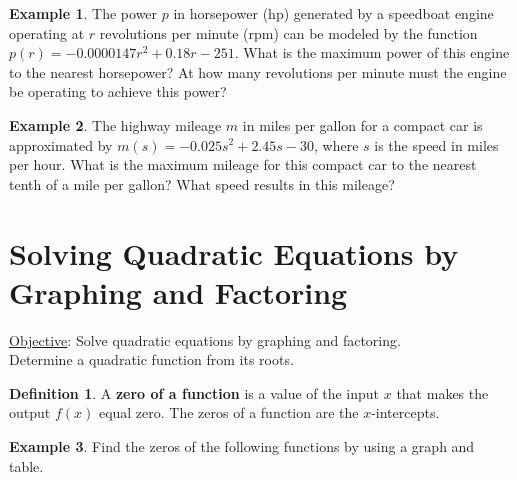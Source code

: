 \documentclass{report}
\theoremstyle{definition}
\newtheorem{example}{\bf Example}
\newtheorem{definition}{\bf Definition}[section]
\begin{document}
 \newpage


\begin{example}
The power $p$ in horsepower (hp) generated by a speedboat engine operating at $r$ revolutions per minute (rpm) can be modeled by
the function $p(r)=-0.0000147r^2+0.18r-251$. What is the maximum power of this engine to the nearest horsepower? At how many 
revolutions per minute must the engine be operating to achieve this power?
\end{example}
\vfill
\begin{example}
The highway mileage $m$ in miles per gallon for a compact car is approximated by $m(s) = -0.025s^2+2.45s-30$, where $s$ is the speed 
in miles per hour. What is the maximum mileage for this compact car to the nearest tenth of a mile per gallon? What speed results in this
 mileage?
\end{example}

\vfill

 \noindent{}

 \newpage


 \section{ Solving Quadratic Equations by Graphing and Factoring  }
 \setcounter{example}{0}
 \setcounter{definition}{0}
 \setcounter{youtry}{0}
 \hfill \small \underline{Objective}: Solve quadratic equations by graphing and factoring.\\ \hfill \indent \hfill Determine a quadratic function from its roots. \normalsize \\
 \begin{definition}
A \textbf{zero of a function} is a value of the input $x$ that makes the output $f(x)$ equal zero. The zeros of a function are the $x$-intercepts.
 \end{definition}
 \begin{example}
Find the zeros of the following functions by using a graph and table.
 \end{example}
\end{document}
